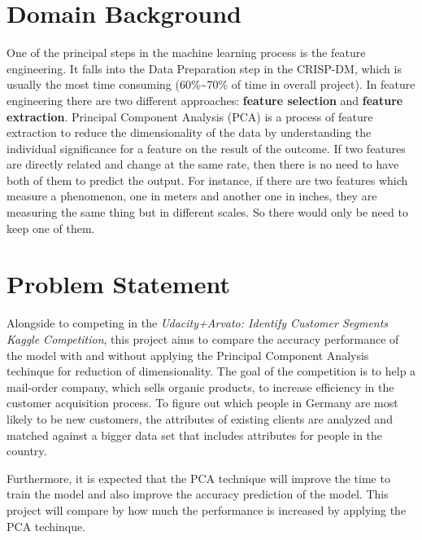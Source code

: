 \hypertarget{domain-background}{%
\section{Domain Background}\label{domain-background}}

One of the principal steps in the machine learning process is the
feature engineering\cite{sarkar2017practical}. It falls into the Data
Preparation step in the CRISP-DM, which is usually the most time
consuming (60\%\textasciitilde70\% of time in overall
project)\cite{sarkar2017practical}. In feature engineering there are two
different approaches: \textbf{feature selection} and \textbf{feature
extraction}\cite{sarkar2017practical}. Principal Component Analysis
(PCA) is a process of feature extraction\cite{sarkar2017practical} to
reduce the dimensionality of the data by understanding the individual
significance for a feature on the result of the
outcome\cite{shlens2014tutorial}. If two features are directly related
and change at the same rate, then there is no need to have both of them
to predict the output. For instance, if there are two features which
measure a phenomenon, one in meters and another one in inches, they are
measuring the same thing but in different scales. So there would only be
need to keep one of them.

\hypertarget{problem-statement}{%
\section{Problem Statement}\label{problem-statement}}

Alongside to competing in the \emph{Udacity+Arvato: Identify Customer
Segments Kaggle Competition}\cite{arvato_kaggle_competition}, this
project aims to compare the accuracy performance of the model with and
without applying the Principal Component Analysis techinque for
reduction of dimensionality. The goal of the competition is to help a
mail-order company, which sells organic products, to increase efficiency
in the customer acquisition process. To figure out which people in
Germany are most likely to be new customers, the attributes of existing
clients are analyzed and matched against a bigger data set that includes
attributes for people in the country.

Furthermore, it is expected that the PCA technique will improve the time
to train the model and also improve the accuracy prediction of the
model. This project will compare by how much the performance is
increased by applying the PCA techinque.


